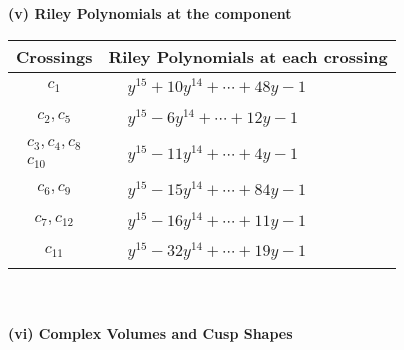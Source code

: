 \documentclass[1p]{elsarticle_modified}
\theoremstyle{definition}
\begin{document}
\newpage\renewcommand{\arraystretch}{1}
\flushleft \textbf{(v) Riley Polynomials at the component}\newline \\
\begin{tabular}{m{50pt}|m{274pt}}
Crossings & \hspace{64pt}Riley Polynomials at each crossing \\
\hline $$\begin{aligned}c_{1}\end{aligned}$$&$\begin{aligned}
&y^{15}+10 y^{14}+\cdots+48 y-1
\end{aligned}$\\
\hline $$\begin{aligned}c_{2},c_{5}\end{aligned}$$&$\begin{aligned}
&y^{15}-6 y^{14}+\cdots+12 y-1
\end{aligned}$\\
\hline $$\begin{aligned}c_{3},c_{4},c_{8}\\c_{10}\end{aligned}$$&$\begin{aligned}
&y^{15}-11 y^{14}+\cdots+4 y-1
\end{aligned}$\\
\hline $$\begin{aligned}c_{6},c_{9}\end{aligned}$$&$\begin{aligned}
&y^{15}-15 y^{14}+\cdots+84 y-1
\end{aligned}$\\
\hline $$\begin{aligned}c_{7},c_{12}\end{aligned}$$&$\begin{aligned}
&y^{15}-16 y^{14}+\cdots+11 y-1
\end{aligned}$\\
\hline $$\begin{aligned}c_{11}\end{aligned}$$&$\begin{aligned}
&y^{15}-32 y^{14}+\cdots+19 y-1
\end{aligned}$\\
\hline
\end{tabular}\\~\\
\newpage\flushleft \textbf{(vi) Complex Volumes and Cusp Shapes}
\end{document}
